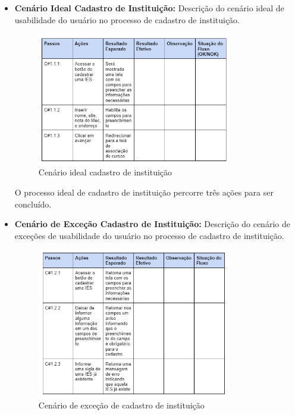 \begin{itemize}
    \item \textbf{Cenário Ideal Cadastro de Instituição:}
Descrição do cenário ideal de usabilidade do usuário no processo de cadastro de instituição.
    
\begin{figure}[ht]
        \centering
\includegraphics[width=0.80\textwidth]{images/teste-cad-instituicao-feliz.jpg}
        \caption{Cenário ideal cadastro de instituição}
        \label{commitsAturo}
    \end{figure}
O processo ideal de cadastro de instituição percorre três ações para ser concluído.

\newpage
    
    \item \textbf{Cenário de Exceção Cadastro de Instituição:}
Descrição do cenário de exceções de usabilidade do usuário no processo de cadastro de instituição.

\begin{figure}[ht]
        \centering
\includegraphics[width=0.80\textwidth]{images/teste-cad-instituicao-excecao.jpg}
        \caption{Cenário de exceção de cadastro de instituição}
        \label{commitsAturo}
    \end{figure}


\end{itemize}
